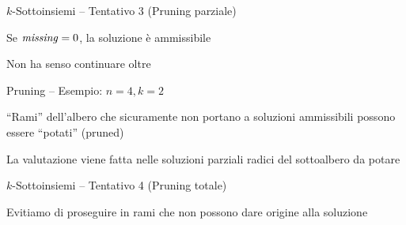 \begin{frame}{$k$-Sottoinsiemi -- Tentativo 3 (Pruning parziale)}

\vspace{-9pt}	
\begin{Procedure}
\caption[A]{(\INTEGER $n$, \INTEGER $\Missing$, $\INTEGER[\,]\ S$, \INTEGER $i$)}
\end{Procedure}

\vspace{-12pt}
\begin{myboxtitle}[Note]
\BI
\item Se $\mathit{missing}=0$, la soluzione è ammissibile
\item Non ha senso continuare oltre
\EI
\end{myboxtitle}

\end{frame}

\begin{frame}{Pruning -- Esempio: $n=4, k=2$}

\BIL
\item “Rami” dell'albero che sicuramente non portano a soluzioni ammissibili possono essere “\alert{potati}”  (\alert{pruned})
\item La valutazione viene fatta nelle soluzioni parziali radici del sottoalbero da potare
\EIL

\centerline{}

\end{frame}




\begin{frame}{$k$-Sottoinsiemi -- Tentativo 4 (Pruning totale)}
	
\vspace{-9pt}	
\begin{Procedure}
\caption[A]{(\INTEGER $n$, \INTEGER $\Missing$, $\INTEGER[\,]\ S$, \INTEGER $i$)}
\end{Procedure}

\vspace{-12pt}
\begin{myboxtitle}[Note]
\BI
\item Evitiamo di proseguire in rami che non possono dare origine alla soluzione
\EI
\end{myboxtitle}

\end{frame}


